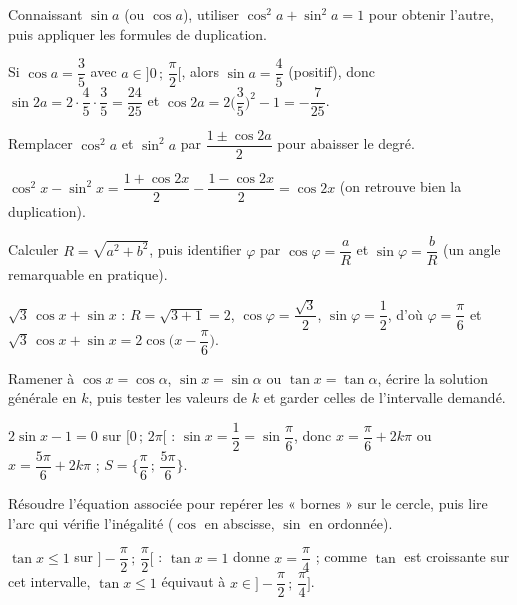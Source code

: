 Connaissant $\sin a$ (ou $\cos a$), utiliser $\cos^2 a+\sin^2 a=1$ pour obtenir
l'autre, puis appliquer les formules de duplication.
\begin{exemple}
Si $\cos a=\dfrac35$ avec $a\in\big]0\,;\,\dfrac{\pi}{2}\big[$, alors
$\sin a=\dfrac45$ (positif), donc $\sin 2a=2\cdot\dfrac45\cdot\dfrac35=\dfrac{24}{25}$
et $\cos 2a=2\Big(\dfrac35\Big)^2-1=-\dfrac{7}{25}$.
\end{exemple}

Remplacer $\cos^2 a$ et $\sin^2 a$ par $\dfrac{1\pm\cos 2a}{2}$ pour abaisser le
degré.
\begin{exemple}
$\cos^2 x-\sin^2 x=\dfrac{1+\cos 2x}{2}-\dfrac{1-\cos 2x}{2}=\cos 2x$
(on retrouve bien la duplication).
\end{exemple}

Calculer $R=\sqrt{a^2+b^2}$, puis identifier $\varphi$ par $\cos\varphi=\dfrac aR$
et $\sin\varphi=\dfrac bR$ (un angle remarquable en pratique).
\begin{exemple}
$\sqrt3\,\cos x+\sin x$ : $R=\sqrt{3+1}=2$, $\cos\varphi=\dfrac{\sqrt3}{2}$,
$\sin\varphi=\dfrac12$, d'où $\varphi=\dfrac{\pi}{6}$ et
$\sqrt3\,\cos x+\sin x=2\cos\!\big(x-\dfrac{\pi}{6}\big)$.
\end{exemple}

Ramener à $\cos x=\cos\alpha$, $\sin x=\sin\alpha$ ou $\tan x=\tan\alpha$, écrire la
solution générale en $k$, puis tester les valeurs de $k$ et garder celles de
l'intervalle demandé.
\begin{exemple}
$2\sin x-1=0$ sur $[0\,;\,2\pi[$ : $\sin x=\dfrac12=\sin\dfrac{\pi}{6}$, donc
$x=\dfrac{\pi}{6}+2k\pi$ ou $x=\dfrac{5\pi}{6}+2k\pi$ ;
$S=\Big\{\dfrac{\pi}{6}\,;\,\dfrac{5\pi}{6}\Big\}$.
\end{exemple}

Résoudre l'équation associée pour repérer les « bornes » sur le cercle, puis lire
l'arc qui vérifie l'inégalité ($\cos$ en abscisse, $\sin$ en ordonnée).
\begin{exemple}
$\tan x\le 1$ sur $\big]-\dfrac{\pi}{2}\,;\,\dfrac{\pi}{2}\big[$ : $\tan x=1$ donne
$x=\dfrac{\pi}{4}$ ; comme $\tan$ est croissante sur cet intervalle,
$\tan x\le 1$ équivaut à $x\in\big]-\dfrac{\pi}{2}\,;\,\dfrac{\pi}{4}\big]$.
\end{exemple}
